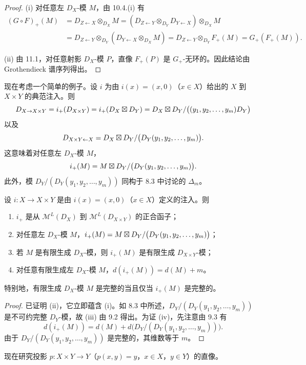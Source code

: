 \begin{proof}
(i) 对任意左 $D_X$-模 $M$，由 10.4.(i) 有
\begin{align*}
(G\circ F)_+(M)&=D_{Z\leftarrow X}\otimes_{D_X}M
=(D_{Z\leftarrow Y}\otimes_{D_Y}D_{Y\leftarrow X})\otimes_{D_X}M\\
&=D_{Z\leftarrow Y}\otimes_{D_Y}(D_{Y\leftarrow X}\otimes_{D_X}M)
=D_{Z\leftarrow Y}\otimes_{D_Y}F_+(M)=G_+(F_+(M)).
\end{align*}

(ii) 由 11.1，对任意射影 $D_X$-模 $P$，直像 $F_+(P)$ 是 $G_+$-无环的。因此结论由 Grothendieck 谱序列得出。
\end{proof}

现在考虑一个简单的例子。设 $i$ 为由 $i(x)=(x,0)$（$x\in X$）给出的 $X$ 到 $X\times Y$ 的典范注入。则
$$D_{X\to X\times Y}=i_+(D_{X\times Y})=i_+(D_X\mathbin{\boxtimes} D_Y)=D_X\mathbin{\boxtimes} D_Y/\bigl((y_1,y_2,\dots,y_m)D_Y\bigr)$$
以及
$$D_{X\times Y\leftarrow X}=D_X\mathbin{\boxtimes} D_Y/\bigl(D_Y(y_1,y_2,\dots,y_m)\bigr).$$
这意味着对任意左 $D_X$-模 $M$，
$$i_+(M)=M\mathbin{\boxtimes} D_Y/\bigl(D_Y(y_1,y_2,\dots,y_m)\bigr).$$
此外，模 $D_Y/(D_Y(y_1,y_2,\dots,y_m))$ 同构于 8.3 中讨论的 $\Delta_m$。

\begin{proposition}
设 $i:X\to X\times Y$ 是由 $i(x)=(x,0)$（$x\in X$）定义的注入。则
\begin{enumerate}[label=(\roman*)]
  \item $i_+$ 是从 $\mathcal{M}^L(D_X)$ 到 $\mathcal{M}^L(D_{X\times Y})$ 的正合函子；
  \item 对任意左 $D_X$-模 $M$，$i_+(M)=M\mathbin{\boxtimes} D_Y/\bigl(D_Y(y_1,y_2,\dots,y_m)\bigr)$；
  \item 若 $M$ 是有限生成 $D_X$-模，则 $i_+(M)$ 是有限生成 $D_{X\times Y}$-模；
  \item 对任意有限生成左 $D_X$-模 $M$，$d(i_+(M))=d(M)+m$。
\end{enumerate}
特别地，有限生成 $D_X$-模 $M$ 是完整的当且仅当 $i_+(M)$ 是完整的。
\end{proposition}

\begin{proof}
已证明 (ii)，它立即蕴含 (i)。如 8.3 中所述，$D_Y/(D_Y(y_1,y_2,\dots,y_m))$ 是不可约完整 $D_Y$-模，故 (iii) 由 9.2 得出。为证 (iv)，先注意由 9.3 有
$$d(i_+(M))=d(M)+d\bigl(D_Y/(D_Y(y_1,y_2,\dots,y_m))\bigr).$$
由于 $D_Y/(D_Y(y_1,y_2,\dots,y_m))$ 是完整的，其维数等于 $m$。
\end{proof}

现在研究投影 $p:X\times Y\to Y$（$p(x,y)=y$，$x\in X$，$y\in Y$）的直像。

